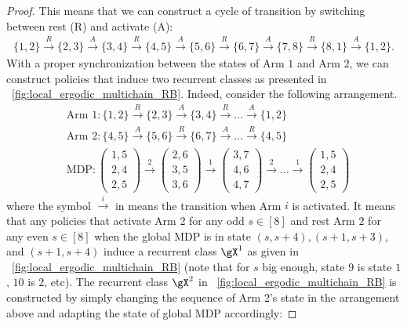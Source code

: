 \begin{proof}
    This means that we can construct a cycle of transition by switching between rest (R) and activate (A):
    \begin{align*}
        \{1,2\} \overset{R}{\to} \{2,3\} \overset{A}{\to} \{3,4\} \overset{R}{\to} \{4,5\} \overset{A}{\to} \{5,6\} \overset{R}{\to} \{6,7\} \overset{A}{\to} \{7,8\} \overset{R}{\to} \{8,1\} \overset{A}{\to} \{1,2\}.
    \end{align*}
    With a proper synchronization between the states of Arm $1$ and Arm $2$, we can construct policies that induce two recurrent classes as presented in \figurename~\ref{fig:local_ergodic_multichain_RB}.
    Indeed, consider the following arrangement.
    \begin{align}
        &\text{Arm 1} : \{1,2\} \overset{R}{\to} \{2,3\} \overset{A}{\to} \{3,4\} \overset{R}{\to} \dots \overset{A}{\to} \{1,2\} \nonumber \\
        &\text{Arm 2} : \{4,5\} \overset{A}{\to} \{5,6\} \overset{R}{\to} \{6,7\} \overset{A}{\to} \dots \overset{R}{\to} \{4,5\} \nonumber \\
        &\text{MDP} : \begin{pmatrix}1,5\\2,4\\2,5\end{pmatrix} \overset{2}{\to} \begin{pmatrix}2,6\\3,5\\3,6\end{pmatrix} \overset{1}{\to} \begin{pmatrix}3,7\\4,6\\4,7\end{pmatrix} \overset{2}{\to} \dots \overset{1}{\to} \begin{pmatrix}1,5\\2,4\\2,5\end{pmatrix} \label{eq:mdp_transition}
    \end{align}
    where the symbol $\overset{i}{\to}$ in  means the transition when Arm $i$ is activated.
    It means that any policies that activate Arm $2$ for any odd $s\in[8]$ and rest Arm $2$ for any even $s\in[8]$ when the global MDP is in state $(s,s+4), (s+1,s+3)$, and $(s+1,s+4)$ induce a recurrent class $\gX^1$ as given in \figurename~\ref{fig:local_ergodic_multichain_RB} (note that for $s$ big enough, state $9$ is state $1$, $10$ is $2$, etc).
    The recurrent class $\gX^2$ in \figurename~\ref{fig:local_ergodic_multichain_RB} is constructed by simply changing the sequence of Arm 2's state in the arrangement above and adapting the state of global MDP accordingly:

\end{proof}
